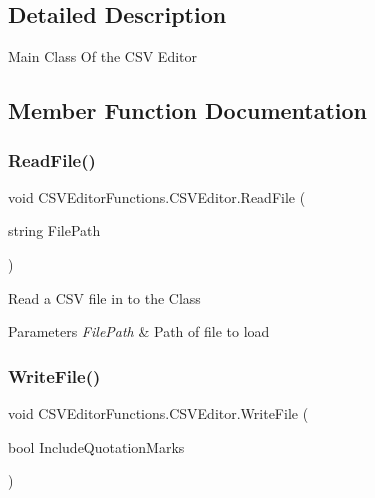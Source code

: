 \subsection{Detailed Description}
Main Class Of the C\+SV Editor 



\subsection{Member Function Documentation}
\mbox{\label{class_c_s_v_editor_functions_1_1_c_s_v_editor_a3e754b74dc2ef0897bce0b8edc762da7}} 
\subsubsection{\texorpdfstring{ReadFile()}{ReadFile()}}
{\footnotesize\ttfamily void C\+S\+V\+Editor\+Functions.\+C\+S\+V\+Editor.\+Read\+File (\begin{DoxyParamCaption}\item[{string}]{File\+Path }\end{DoxyParamCaption})}



Read a C\+SV file in to the Class 


\begin{DoxyParams}{Parameters}
{\em File\+Path} & Path of file to load\\
\hline
\end{DoxyParams}
\mbox{\label{class_c_s_v_editor_functions_1_1_c_s_v_editor_a5a4cc8955ae7dd38cd00dfcb13463639}} 
\subsubsection{\texorpdfstring{WriteFile()}{WriteFile()}\hspace{0.1cm}{\footnotesize\ttfamily [1/2]}}
{\footnotesize\ttfamily void C\+S\+V\+Editor\+Functions.\+C\+S\+V\+Editor.\+Write\+File (\begin{DoxyParamCaption}\item[{bool}]{Include\+Quotation\+Marks }\end{DoxyParamCaption})}



